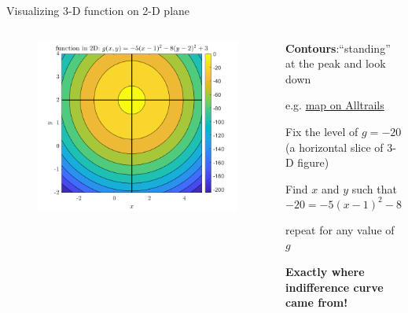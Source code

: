 \documentclass[11pt,aspectratio=169,usenames,dvipsnames]{beamer}
\let\tempone\itemize
\let\temptwo\enditemize
\renewenvironment{itemize}{\tempone\addtolength{\itemsep}{\fill}}{\temptwo}
\begin{document}
\begin{frame}{Visualizing 3-D function on 2-D plane}
\label{slide:Visualizing_3_D_function_on_2_D_plane}

    \begin{columns}
        \begin{column}{0.5\textwidth}
            \begin{figure}
                \includegraphics[width=\textwidth]{./figures/2VarContours.png}
            \end{figure}
        \end{column}
        \begin{column}{0.5\textwidth}
            \begin{itemize}
                \item \textbf{Contours}:``standing'' at the peak and look down
                \begin{itemize}
                    \item e.g. \alert{\href{https://www.alltrails.com/}{map on Alltrails}}
                \end{itemize}
                \item Fix the level of $ g = -20 $ (a \alert{horizontal slice} of 3-D figure)
                \item Find $ x $ and $ y $ such that
                \begin{equation*}
                     -20 = -5( x-1 )^{2} - 8( y-2 )^{2} + 3
                \end{equation*}
                \item repeat for any value of $ g $
                \item \textbf{Exactly where indifference curve came from!}
            \end{itemize}
        \end{column}
    \end{columns}
\end{frame}
\end{document}
